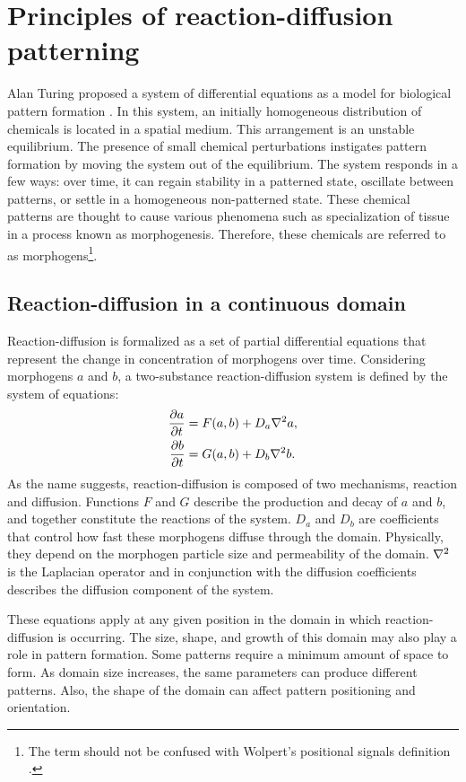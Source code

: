 \chapter{Principles of reaction-diffusion patterning} 
Alan Turing proposed a system of differential equations as a model for biological pattern formation \citep{turing1952}. In this system, an initially homogeneous distribution of chemicals is located in a spatial medium. This arrangement is an unstable equilibrium. The presence of small chemical perturbations instigates pattern formation by moving the system out of the equilibrium. The system responds in a few ways: over time, it can regain stability in a patterned state, oscillate between patterns, or settle in a homogeneous non-patterned state. These chemical patterns are thought to cause various phenomena such as specialization of tissue in a process known as morphogenesis. Therefore, these chemicals are referred to as morphogens\footnote{The term  should not be confused with Wolpert’s positional signals definition \citep{wolpert1996}.}.

\section{Reaction-diffusion in a continuous domain}
Reaction-diffusion is formalized as a set of partial differential equations that represent the change in concentration of morphogens over time. Considering morphogens $a$ and $b$, a two-substance reaction-diffusion system is defined by the system of equations:
	\begin{equation}
	\begin{aligned} \label{eq:basicRD}
		\frac{\partial a}{\partial t} &= F(a, b) + D_a \nabla^2 a,\\
		\frac{\partial b}{\partial t} &= G(a, b) + D_b \nabla^2 b.
	\end{aligned}
	\end{equation}
As the name suggests, reaction-diffusion is composed of two mechanisms, reaction and diffusion. Functions $F$ and $G$ describe the production and decay of $a$ and $b$, and together constitute the reactions of the system. $D_a$ and $D_b$ are coefficients that control how fast these morphogens diffuse through the domain. Physically, they depend on the morphogen particle size and permeability of the domain. $\nabla^2{}$ is the Laplacian operator and in conjunction with the diffusion coefficients describes the diffusion component of the system.

These equations apply at any given position in the domain in which reaction-diffusion is occurring. The size, shape, and growth of this domain may also play a role in pattern formation. Some patterns require a minimum amount of space to form. As domain size increases, the same parameters can produce different patterns. Also, the shape of the domain can affect pattern positioning and orientation.

